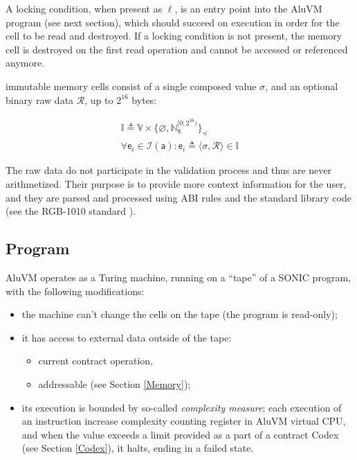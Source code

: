 \documentclass[9pt,oneside]{amsart}
\begin{document}
\begin{multicols}{2}
A locking condition, when present as $\ell$, is an entry point into the AluVM program (see next section),
which should succeed on execution in order for the cell to be read and destroyed.
If a locking condition is not present, the memory cell is destroyed on the first read operation
and cannot be accessed or referenced anymore.

\Gls{immutable memory} cells consist of a single \gls{composed value} $\sigma$,
and an optional binary raw data $\mathcal{R}$, up to $2^{16}$ bytes:

\begin{gather}
\mathbb{I} \triangleq \mathbb{V} \times \{ \varnothing, \mathbb{N}_8^{[0; 2^{16})} \}_\preceq \\
\forall \mathsf{e}_i \in \mathcal{I}(\mathsf{a}) : \mathsf{e}_i \triangleq \langle \sigma, \mathcal{R} \rangle \in \mathbb{I}
\end{gather}

The raw data do not participate in the validation process and thus are never arithmetized.
Their purpose is to provide more context information for the user, and they are parsed and processed
using ABI rules and the standard library code (see the RGB-1010 standard \cite{RGB1010}).


\subsection{Program}\label{Program}

AluVM operates as a Turing machine, running on a ``tape'' of a SONIC program,
with the following modifications:

\begin{itemize}
\item the machine can't change the cells on the tape (the program is read-only);
\item it has access to external data outside of the tape:
    \begin{itemize}
    \item current contract operation,
    \item addressable (see Section \ref{Memory});
    \end{itemize}
\item its execution is bounded by so-called \emph{complexity measure};
  each execution of an instruction increase complexity counting register in AluVM virtual CPU,
  and when the value exceeds a limit provided as a part of a contract Codex (see Section \ref{Codex}),
  it halts, ending in a failed state.
\end{itemize}


\end{multicols}
\end{document}
